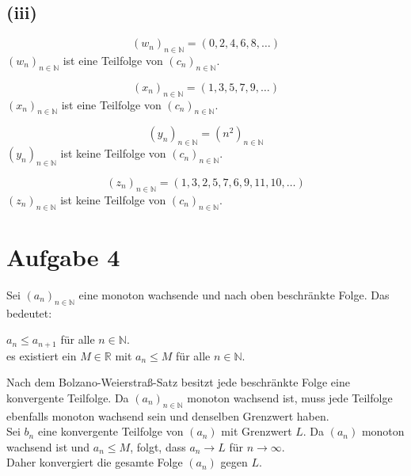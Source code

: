 \documentclass{article}
\begin{document}
\subsection*{(iii)}


    \[(w_n)_{n \in \mathbb{N}} = (0, 2, 4, 6, 8, \dots)\]  
    \((w_n)_{n \in \mathbb{N}}\) ist eine Teilfolge von \((c_n)_{n \in \mathbb{N}}\).

    \[(x_n)_{n \in \mathbb{N}} = (1, 3, 5, 7, 9, \dots)\]  
    \((x_n)_{n \in \mathbb{N}}\) ist eine Teilfolge von \((c_n)_{n \in \mathbb{N}}\).

    \[(y_n)_{n \in \mathbb{N}} = (n^2)_{n \in \mathbb{N}}\]  
    \((y_n)_{n \in \mathbb{N}}\) ist keine Teilfolge von \((c_n)_{n \in \mathbb{N}}\).

    \[(z_n)_{n \in \mathbb{N}} = (1, 3, 2, 5, 7, 6, 9, 11, 10, \dots)\]  
    \((z_n)_{n \in \mathbb{N}}\) ist keine Teilfolge von \((c_n)_{n \in \mathbb{N}}\).


\section*{Aufgabe 4}

Sei \((a_n)_{n \in \mathbb{N}}\) eine monoton wachsende und nach oben beschränkte Folge. Das bedeutet:
\begin{center}
    \(a_n \leq a_{n+1}\) für alle \(n \in \mathbb{N}\). \\
    es existiert ein \(M \in \mathbb{R}\) mit \(a_n \leq M\) für alle \(n \in \mathbb{N}\).
\end{center}

Nach dem Bolzano-Weierstraß-Satz besitzt jede beschränkte Folge eine konvergente Teilfolge. Da \((a_n)_{n \in \mathbb{N}}\) monoton wachsend ist, muss jede Teilfolge ebenfalls monoton wachsend sein und denselben Grenzwert haben.\\

Sei \(b_n\) eine konvergente Teilfolge von \((a_n)\) mit Grenzwert \(L\). Da \((a_n)\) monoton wachsend ist und \(a_n \leq M\), folgt, dass \(a_n \to L\) für \(n \to \infty\). \\

Daher konvergiert die gesamte Folge \((a_n)\) gegen \(L\).
\end{document}
